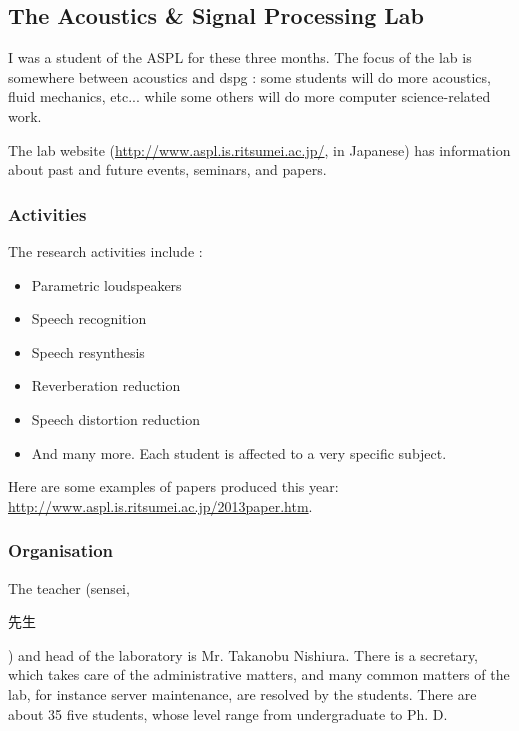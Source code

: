 \subsection{The Acoustics \& Signal Processing Lab}
I was a student of the \ac{ASPL} for these three months. The focus of the lab is somewhere between acoustics and \ac{dspg} : some students will do more acoustics, fluid mechanics, etc...  while some others will do more computer science-related work.

The lab website (\url{http://www.aspl.is.ritsumei.ac.jp/}, in Japanese) has information about past and future events, seminars, and papers. 
\subsubsection{Activities}
The research activities include :
\begin{itemize}
\item Parametric loudspeakers
\item Speech recognition
\item Speech resynthesis
\item Reverberation reduction
\item Speech distortion reduction
\item And many more. Each student is affected to a very specific subject.
\end{itemize}

Here are some examples of papers produced this year: \url{http://www.aspl.is.ritsumei.ac.jp/2013paper.htm}.

\subsubsection{Organisation}
The teacher (sensei, \begin{CJK}{UTF8}{min}先生\end{CJK}) and head of the laboratory is Mr. Takanobu Nishiura. There is a secretary, which takes care of the administrative matters, and many common matters of the lab, for instance server maintenance, are resolved by the students.
There are about 35 five students, whose level range from undergraduate to Ph. D.